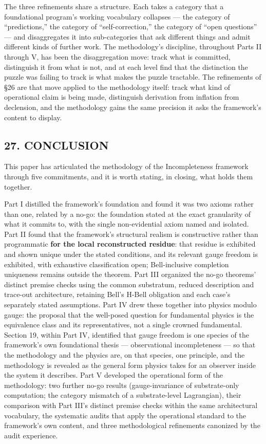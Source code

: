 \documentclass[
]{article}
\begin{document}
The three refinements share a structure. Each takes a category that a
foundational program's working vocabulary collapses --- the category of
``predictions,'' the category of ``self-correction,'' the category of
``open questions'' --- and disaggregates it into sub-categories that ask
different things and admit different kinds of further work. The
methodology's discipline, throughout Parts II through V, has been the
disaggregation move: track what is committed, distinguish it from what
is not, and at each level find that the distinction the puzzle was
failing to track is what makes the puzzle tractable. The refinements of
§26 are that move applied to the methodology itself: track what kind of
operational claim is being made, distinguish derivation from inflation
from declension, and the methodology gains the same precision it asks
the framework's content to display.

\hypertarget{conclusion}{%
\subsection{27. CONCLUSION}\label{conclusion}}

This paper has articulated the methodology of the Incompleteness
framework through five commitments, and it is worth stating, in closing,
what holds them together.

Part I distilled the framework's foundation and found it was two axioms
rather than one, related by a no-go: the foundation stated at the exact
granularity of what it commits to, with the single non-evidential axiom
named and isolated. Part II found that the framework's structural
realism is constructive rather than programmatic \textbf{for the local
reconstructed residue}: that residue is exhibited and shown unique under
the stated conditions, and its relevant gauge freedom is exhibited, with
exhaustive classification open; Bell-inclusive completion uniqueness
remains outside the theorem. Part III organized the no-go theorems'
distinct premise checks using the common substratum, reduced description
and trace-out architecture, retaining Bell's H-Bell obligation and each
case's separately stated assumptions. Part IV drew these together into
physics modulo gauge: the proposal that the well-posed question for
fundamental physics is the equivalence class and its representatives,
not a single crowned fundamental. Section 19, within Part IV, identified
that gauge freedom is one species of the framework's own foundational
thesis --- observational incompleteness --- so that the methodology and
the physics are, on that species, one principle, and the methodology is
revealed as the general form physics takes for an observer inside the
system it describes. Part V developed the operational form of the
methodology: two further no-go results (gauge-invariance of
substrate-only computation; the category mismatch of a substrate-level
Lagrangian), their comparison with Part III's distinct premise checks
within the same architectural vocabulary, the systematic audits that
apply the operational standard to the framework's own content, and three
methodological refinements canonized by the audit experience.
\end{document}
